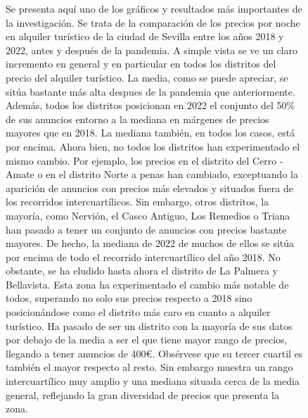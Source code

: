 \documentclass[a4paper,10pt]{article}
\begin{document}
\begin{figure}[ht]
                Se presenta aquí uno de los gráficos y resultados más importantes de la investigación. Se trata de la comparación de los
                precios por noche en alquiler turístico de la ciudad de Sevilla entre los años 2018 y 2022, antes y después de la pandemia.
                A simple vista se ve un claro incremento en general y en particular en todos los distritos del precio del alquiler turístico.
                La media, como se puede apreciar, se sitúa bastante más alta despues de la pandemia que anteriormente. Además, todos los distritos
                posicionan en 2022 el conjunto del 50\% de sus anuncios entorno a la mediana en márgenes de precios mayores que en 2018.
                La mediana también, en todos los casos, está por encima. Ahora bien, no todos los distritos han experimentado el mismo cambio.
                Por ejemplo, los precios en el distrito del Cerro - Amate o en el distrito Norte a penas han cambiado, exceptuando la aparición 
                de anuncios con precios más elevados y situados fuera de los recorridos intercuartílicos. Sin embargo, otros distritos, la mayoría,
                como Nervión, el Casco Antiguo, Los Remedios o Triana han pasado a tener un conjunto de anuncios con precios bastante mayores. De hecho, 
                la mediana de 2022 de muchos de ellos se sitúa por encima de todo el recorrido intercuartílico del año 2018.
                No obstante, se ha eludido hasta ahora el distrito de La Palmera y Bellavista. Esta zona ha experimentado el cambio más notable de todos, 
                superando no solo sus precios respecto a 2018 sino posicionándose como el distrito más caro en cuanto a alquiler turístico. Ha pasado de 
                ser un distrito con la mayoría de sus datos por debajo de la media a ser el que tiene mayor rango de precios, llegando a tener
                anuncios de 400€. Obsérvese que su tercer cuartil es también el mayor respecto al resto. Sin embargo muestra un rango 
                intercuartílico muy amplio y una mediana situada cerca de la media general, reflejando la gran diversidad de precios que presenta
                la zona.

            \end{figure}

            \clearpage
            
\end{document}
